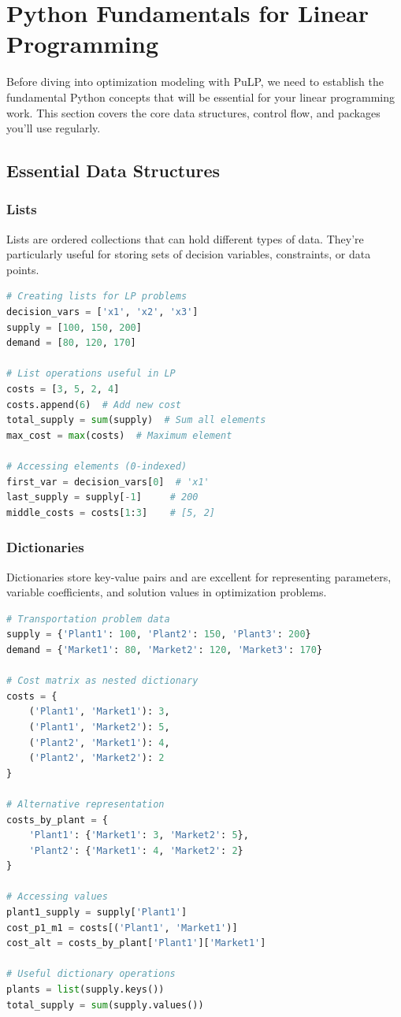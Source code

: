 \section{Python Fundamentals for Linear Programming}

Before diving into optimization modeling with PuLP, we need to establish the fundamental Python concepts that will be essential for your linear programming work. This section covers the core data structures, control flow, and packages you'll use regularly.

\subsection{Essential Data Structures}

\subsubsection{Lists}
Lists are ordered collections that can hold different types of data. They're particularly useful for storing sets of decision variables, constraints, or data points.

\begin{lstlisting}[language=Python]
# Creating lists for LP problems
decision_vars = ['x1', 'x2', 'x3']
supply = [100, 150, 200]
demand = [80, 120, 170]

# List operations useful in LP
costs = [3, 5, 2, 4]
costs.append(6)  # Add new cost
total_supply = sum(supply)  # Sum all elements
max_cost = max(costs)  # Maximum element

# Accessing elements (0-indexed)
first_var = decision_vars[0]  # 'x1'
last_supply = supply[-1]     # 200
middle_costs = costs[1:3]    # [5, 2]
\end{lstlisting}

\subsubsection{Dictionaries}
Dictionaries store key-value pairs and are excellent for representing parameters, variable coefficients, and solution values in optimization problems.

\begin{lstlisting}[language=Python]
# Transportation problem data
supply = {'Plant1': 100, 'Plant2': 150, 'Plant3': 200}
demand = {'Market1': 80, 'Market2': 120, 'Market3': 170}

# Cost matrix as nested dictionary
costs = {
    ('Plant1', 'Market1'): 3,
    ('Plant1', 'Market2'): 5,
    ('Plant2', 'Market1'): 4,
    ('Plant2', 'Market2'): 2
}

# Alternative representation
costs_by_plant = {
    'Plant1': {'Market1': 3, 'Market2': 5},
    'Plant2': {'Market1': 4, 'Market2': 2}
}

# Accessing values
plant1_supply = supply['Plant1']
cost_p1_m1 = costs[('Plant1', 'Market1')]
cost_alt = costs_by_plant['Plant1']['Market1']

# Useful dictionary operations
plants = list(supply.keys())
total_supply = sum(supply.values())
\end{lstlisting}

